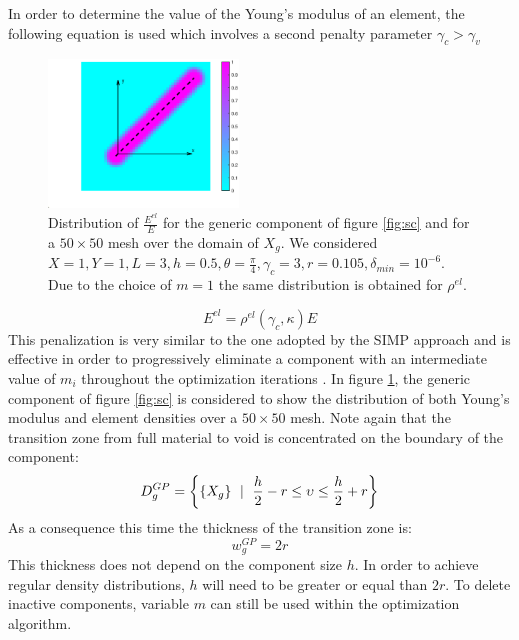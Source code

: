 In order to determine the value of the Young's modulus of an element, the following equation is used which involves a second penalty parameter $\gamma_c>\gamma_v$ 
\begin{figure}[!ht]
\centering
  \includegraphics[width=0.45\textwidth]{images/Ch3/gpe.eps}
\caption{Distribution of $ \frac{E^{el}}{E}$  for the generic component of figure \ref{fig:sc} and for a $50\times50$ mesh over the domain of $X_g$. We considered $X=1,Y=1,L=3,h=0.5,\theta=\frac{\pi}{4}, \gamma_c=3, r=0.105, \delta_{min}=10^{-6} $. Due to the choice of $m=1$  the same distribution is obtained for $\rho^{el}$.}
\label{fig:gpe}       %
\end{figure}
\begin{equation}
    E^{el}=\rho^{el}(\gamma_c ,\kappa)E
\end{equation}
This penalization is very similar to the one adopted by the SIMP approach and is effective in order to progressively eliminate a component with an intermediate value of $m_i$ throughout the optimization iterations \cite{norato2015geometry}. 
In figure \ref{fig:gpe}, the generic component of figure \ref{fig:sc} is considered to show the distribution of both Young's modulus and element densities over a $50\times50$ mesh. Note again that the transition zone from full material to void is concentrated on the boundary of the component:
\begin{equation}
D_g^{GP}=\left\lbrace \left\{{X_g}\right\}\ \mid \  \frac{h}{2}-r\leq \upsilon \leq  \frac{h}{2}+r\right\rbrace    
\end{equation}
As a consequence this time the thickness of the transition zone is:
\begin{equation}
    w_g^{GP}=2r
\end{equation}
This thickness does not depend on the component size $h$. In order to achieve regular density distributions, $h$ will need to be greater or equal than $2r$. To delete inactive components, variable $m$  can still be used within the optimization algorithm.
